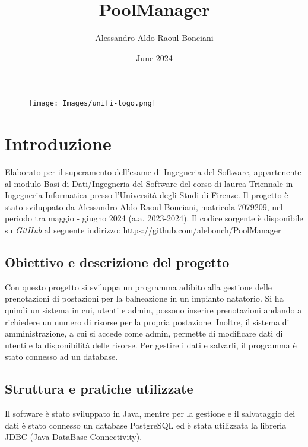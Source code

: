 \documentclass{article}
\title{\textbf{PoolManager}}
\author{Alessandro Aldo Raoul Bonciani}
\date{June 2024}
\begin{document}
 \maketitle

    \vspace{-1em}

    \begin{figure}[h]
        \begin{minipage}{\textwidth}
            \centering
            \texttt{[image: Images/unifi-logo.png]}
        \end{minipage}
        \label{fig:uni-logo}
    \end{figure}

\newpage
\tableofcontents
\newpage


\section{Introduzione}\label{sec:introduzione}
Elaborato per il superamento dell'esame di Ingegneria del Software, appartenente al modulo Basi di Dati/Ingegneria del Software del corso di laurea Triennale in Ingegneria Informatica presso l'Università degli Studi di Firenze.
\newline
\newline
Il progetto è stato sviluppato da Alessandro Aldo Raoul Bonciani, matricola 7079209, nel periodo tra maggio - giugno 2024 (a.a. 2023-2024).
\newline
\newline
Il codice sorgente è disponibile su \textit{GitHub} al seguente indirizzo:
\newline
\hyperlink{https://github.com/alebonch/PoolManager}{https://github.com/alebonch/PoolManager}
\subsection{Obiettivo e descrizione del progetto}\label{subsec:obiettivo}
Con questo progetto si sviluppa un programma adibito alla gestione delle prenotazioni di postazioni per la balneazione in un impianto natatorio. 
\newline
Si ha quindi un sistema in cui, utenti e admin, possono inserire prenotazioni andando a richiedere un numero di risorse per la propria postazione.
Inoltre, il sistema di amministrazione, a cui si accede come admin, permette di modificare dati di utenti e la disponibilità delle risorse. Per gestire i dati e salvarli, il programma è stato connesso ad un database.
\subsection{Struttura e pratiche utilizzate}\label{subsec:struttura-e-pratiche-utilizzate}
   Il software è stato sviluppato in Java, mentre per la gestione e il salvataggio dei dati è stato connesso un database PostgreSQL ed è stata utilizzata
            la libreria JDBC (Java DataBase Connectivity). \\
\end{document}
